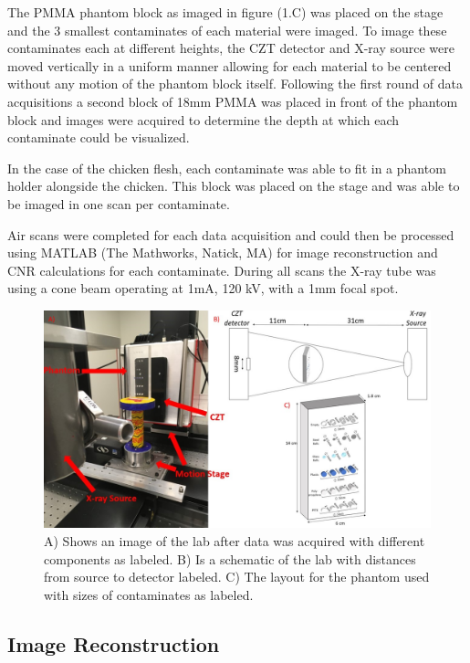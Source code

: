 \documentclass[a4paper,11pt]{article}
\begin{document}
The PMMA phantom block as imaged in figure (1.C) was placed on the stage and the 3 smallest contaminates of each material were imaged. To image these contaminates each at different heights, the CZT detector and X-ray source were moved vertically in a uniform manner allowing for each material to be centered without any motion of the phantom block itself. Following the first round of data acquisitions a second block of 18mm PMMA was placed in front of the phantom block and images were acquired to determine the depth at which each contaminate could be visualized. 

In the case of the chicken flesh, each contaminate was able to fit in a phantom holder alongside the chicken. This block was placed on the stage and was able to be imaged in one scan per contaminate. 

Air scans were completed for each data acquisition and could then be processed using MATLAB (The Mathworks, Natick, MA) for image reconstruction and CNR calculations for each contaminate. During all scans the X-ray tube was using a cone beam operating at 1mA, 120 kV, with a 1mm focal spot. 

\begin{figure}[htbp]

\includegraphics[width=\textwidth]{FullFigure.jpg}

\caption{A) Shows an image of the lab after data was acquired with different components as labeled. B) Is a schematic of the lab with distances from source to detector labeled. C) The layout for the phantom used with sizes of contaminates as labeled.}
\label{figcali}
\end{figure}

\subsection{Image Reconstruction}
\end{document}
